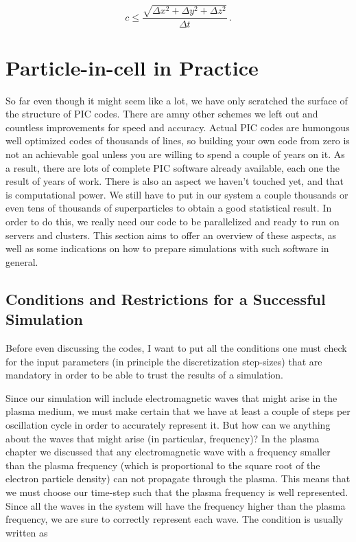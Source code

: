 \documentclass[12pt, class=report, crop=false]{standalone}
\begin{document}
\begin{equation}
  c \leq \frac{\sqrt{\Delta x^2 + \Delta y^2 + \Delta z^2}}{\Delta t}\,.
\end{equation}

\section{Particle-in-cell in Practice}
So far even though it might seem like a lot, we have only scratched the surface of the structure of PIC codes. There are amny other schemes we left out and countless improvements for speed and accuracy. Actual PIC codes are humongous well optimized codes of thousands of lines, so building your own code from zero is not an achievable goal unless you are willing to spend a couple of years on it. As a result, there are lots of complete PIC software already available, each one the result of years of work. There is also an aspect we haven't touched yet, and that is computational power. We still have to put in our system a couple thousands or even tens of thousands of superparticles to obtain a good statistical result. In order to do this, we really need our code to be parallelized and ready to run on servers and clusters. This section aims to offer an overview of these aspects, as well as some indications on how to prepare simulations with such software in general.

\subsection{Conditions and Restrictions for a Successful Simulation}
Before even discussing the codes, I want to put all the conditions one must check for the input parameters (in principle the discretization step-sizes) that are mandatory in order to be able to trust the results of a simulation.

Since our simulation will include electromagnetic waves that might arise in the plasma medium, we must make certain that we have at least a couple of steps per oscillation cycle in order to accurately represent it. But how can we anything about the waves that might arise (in particular, frequency)? In the plasma chapter we discussed that any electromagnetic wave with a frequency smaller than the plasma frequency (which is proportional to the square root of the electron particle density) can not propagate through the plasma. This means that we must choose our time-step such that the plasma frequency is well represented. Since all the waves in the system will have the frequency higher than the plasma frequency, we are sure to correctly represent each wave. The condition is usually written as
\end{document}

